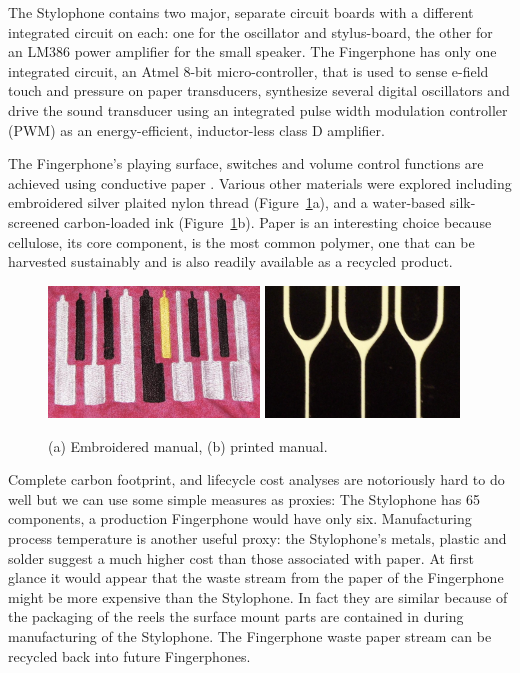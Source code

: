 The Stylophone contains two major, separate circuit boards with a
different integrated circuit on each: one for the oscillator and stylus-board,
the other for an LM386 power amplifier for the small speaker. The Fingerphone has
only one integrated circuit, an Atmel 8-bit micro-controller, that is used to
sense e-field touch and pressure on paper transducers, synthesize several digital
oscillators and drive the sound transducer using an integrated pulse width
modulation controller (PWM) as an energy-efficient, inductor-less class D
amplifier.

The Fingerphone's playing surface, switches and volume control
functions are achieved using conductive paper \cite{Koehly:2006,Koehly:2011}. Various other materials
were explored including embroidered silver plaited nylon thread (Figure~\ref{Freed:img-3}a), and a
water-based silk-screened carbon-loaded ink (Figure~\ref{Freed:img-3}b).
Paper is an interesting choice because cellulose, its core
component, is the most common polymer, one that can be harvested sustainably and
is also readily available as a recycled product.

\begin{figure}[t]
\centering
\includegraphics[height=35mm]{fig3}
\includegraphics[height=35mm]{fig4}
\caption{(a) Embroidered manual, (b) printed manual.}
\label{Freed:img-3}
\end{figure}

Complete carbon footprint, and lifecycle cost analyses are
notoriously hard to do well but we can use some simple measures as proxies: The
Stylophone has 65 components, a production Fingerphone would have only six.
Manufacturing process temperature is another useful proxy: the Stylophone's
metals, plastic and solder suggest a much higher cost than those associated with
paper. At first glance it would appear that the waste stream from the paper of
the Fingerphone might be more expensive than the Stylophone. In fact they are
similar because of the packaging of the reels the surface mount parts are
contained in during manufacturing of the Stylophone. The Fingerphone waste paper
stream can be recycled back into future Fingerphones.

